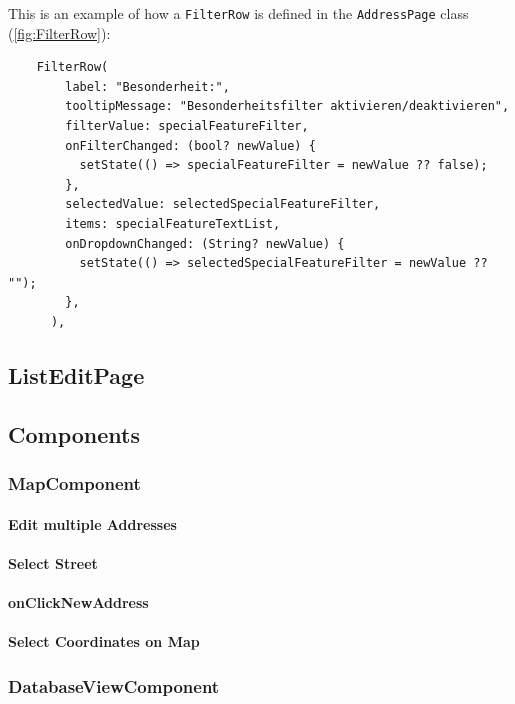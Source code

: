 This is an example of how a \texttt{FilterRow} is defined in the \texttt{AddressPage} class (\ref{fig:FilterRow}):
\lstset{style=mycsharp, caption=FilterRow in AddressPage}
\begin{lstlisting}
    FilterRow(
        label: "Besonderheit:",
        tooltipMessage: "Besonderheitsfilter aktivieren/deaktivieren",
        filterValue: specialFeatureFilter,
        onFilterChanged: (bool? newValue) {
          setState(() => specialFeatureFilter = newValue ?? false);
        },
        selectedValue: selectedSpecialFeatureFilter,
        items: specialFeatureTextList,
        onDropdownChanged: (String? newValue) {
          setState(() => selectedSpecialFeatureFilter = newValue ?? "");
        },
      ),
\end{lstlisting}




 

\subsection{ListEditPage}


\subsection{Components}


\subsubsection{MapComponent}


\paragraph{Edit multiple Addresses}

\label{fig:Select Street}
\paragraph{Select Street}

\paragraph{onClickNewAddress}

\paragraph{Select Coordinates on Map}


\subsubsection{DatabaseViewComponent}

